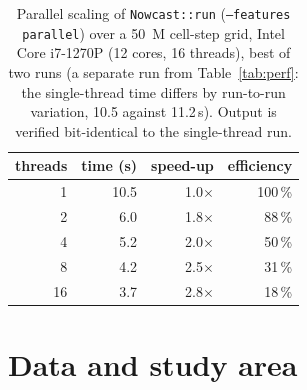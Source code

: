 \documentclass[authoryear,preprint,review,12pt]{elsarticle}
\begin{document}
\begin{table}[ht]
\centering
\caption{Parallel scaling of \texttt{Nowcast::run} (\texttt{--features parallel})
over a 50~M cell-step grid, Intel Core i7-1270P (12 cores, 16 threads), best of two runs (a separate run from
Table~\ref{tab:perf}: the single-thread time differs by run-to-run variation, 10.5 against 11.2\,s). Output is verified
bit-identical to the single-thread run.}
\label{tab:scaling}
\begin{tabular}{@{}rrrr@{}}
\toprule
threads & time (s) & speed-up & efficiency \\
\midrule
1  & 10.5 & 1.0$\times$ & 100\,\% \\
2  & 6.0  & 1.8$\times$ & 88\,\% \\
4  & 5.2  & 2.0$\times$ & 50\,\% \\
8  & 4.2  & 2.5$\times$ & 31\,\% \\
16 & 3.7  & 2.8$\times$ & 18\,\% \\
\bottomrule
\end{tabular}
\end{table}

\section{Data and study area}
\end{document}
